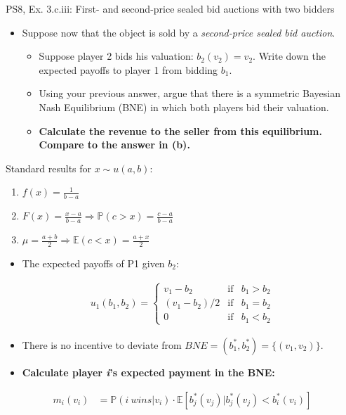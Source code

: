 \begin{frame}{PS8, Ex. 3.c.iii: First- and second-price sealed bid auctions with two bidders}
    \begin{multicols}{2}
      \begin{itemize}
        \item[(c)] Suppose now that the object is sold by a \textit{second-price sealed bid auction}.
        \begin{itemize}\normalsize
          \item[i.]   Suppose player 2 bids his valuation: $b_2(v_2) = v_2$. Write down the expected payoffs to player 1 from bidding $b_1$.
          \item[ii.]  Using your previous answer, argue that there is a symmetric Bayesian Nash Equilibrium (BNE) in which both players bid their valuation.
          \item[iii.] \textbf{Calculate the revenue to the seller from this equilibrium. Compare to the answer in (b).}
        \end{itemize}
      \end{itemize}
      Standard results for $x\sim u(a, b):$
      \vspace{-6pt}
      \begin{enumerate}
        \item[PDF:] $f(x)=\frac{1}{b-a}$
        \item[CDF:] $F(x)=\frac{x-a}{b-a}\Rightarrow\mathbb{P}(c>x)=\frac{c-a}{b-a}$
        \item[Mean:] $\mu=\frac{a+b}{2}\Rightarrow\mathbb{E}(c<x)=\frac{a+x}{2}$
      \end{enumerate}
      \vfill\null\columnbreak
      \begin{itemize}
        \item[(i)] The expected payoffs of P1 given $b_2$:
      \end{itemize}
      \vspace{-16pt}
      \begin{align*}
        u_1(b_1,b_2)=\left\{\begin{array}{lcl}
          v_1-b_2     & \text{if} & b_1>b_2 \\
          (v_1-b_2)/2 & \text{if} & b_1=b_2 \\
          0           & \text{if} & b_1<b_2
        \end{array}\right.
      \end{align*}
      \vspace{-18pt}
      \begin{itemize}
        \item[(ii)] There is no incentive to deviate from $BNE=(b_1^*,b_2^*)=\{(v_1,v_2)\}$.
        \item[(iii)] \textbf{Calculate player \textit{i}'s expected payment in the BNE:}
      \end{itemize}
      \vspace{-12pt}
      \begin{align*}
        m_i(v_i)&=\mathbb{P}(i\ wins|v_i)\cdot\mathbb{E}[b_j^*(v_j)|b_j^*(v_j)<b_i^*(v_i)]
      \end{align*}
      \vfill\null
    \end{multicols}
\end{frame}
